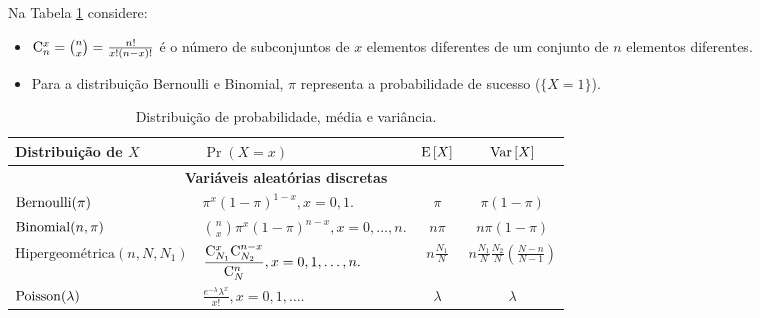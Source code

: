 \documentclass[10pt]{article}%
\renewcommand{\ra}[1]{\renewcommand{\arraystretch}{#1}}
\def\Var{{\rm Var}\,}
\def\E{{\rm E}\,}
\begin{document}
Na Tabela \ref{tab1} considere:
\begin{itemize}
\item ${\rm C}_n^x = {n \choose x} = \frac{n!}{x! (n - x)!}$ é o número de subconjuntos de $x$ elementos diferentes de um conjunto de $n$ elementos diferentes.
\item Para a distribuição Bernoulli e Binomial, $\pi$ representa a probabilidade de sucesso ($\{X = 1\}$).
\end{itemize}
\begin{table}[ht]\centering
\ra{1.3}
\caption{Distribuição de probabilidade, média e variância.}
\label{tab1}
\begin{tabular}{@{}llcc@{}}\toprule
Distribuição de $X$ & $\Pr(X = x)$ & $\E[X]$ & $\Var[X]$\\
\midrule
\multicolumn{4}{c}{\bf Variáveis aleatórias discretas}\\
\midrule
${\rm Bernoulli}(\pi)$ & $\displaystyle{\pi^x (1 - \pi)^{1 - x}, x = 0,1.}$ & $\pi$ & $\pi(1 - \pi)$\\
\midrule
${\rm Binomial}(n, \pi)$ & $\displaystyle{{n \choose x}\pi^x (1 - \pi)^{n - x}, x = 0,\ldots,n.}$ & $n\pi$ & $n\pi(1 - \pi)$\\
\midrule
$\mbox{Hipergeométrica}(n,N,N_1)$ & $\displaystyle{\frac{{\rm C}_{N_1}^x {\rm C}_{N_2}^{n-x}}{{\rm C}_N^n}, x = 0, 1, \ldots, n.}$& $\displaystyle{n\frac{N_1}{N}}$ & $\displaystyle{n\frac{N_1}{N}\frac{N_2}{N}}\left(\frac{N-n}{N-1}\right)$\\
\midrule
${\rm Poisson}(\lambda)$ & $\displaystyle{\frac{e^{-\lambda}\lambda^x}{x!}, x = 0, 1, \ldots.}$& $\lambda$ & $\lambda$\\

\end{tabular}
\end{table}
\end{document}
